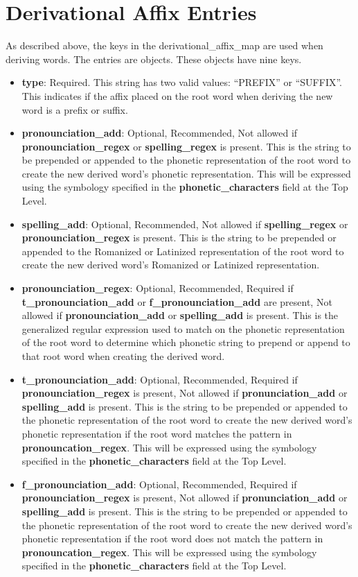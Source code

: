 \chapter{Derivational Affix Entries}
As described above, the keys in the derivational\_affix\_map are used when deriving words.  The entries are objects.  These objects have nine keys.
\begin{itemize}
	\item \textbf{type}: Required.  This string has two valid values: ``PREFIX'' or ``SUFFIX''.  This indicates if the affix placed on the root word when deriving the new word is a prefix or suffix.
	\item \textbf{pronounciation\_add}: Optional, Recommended, Not allowed if \textbf{pronounciation\_regex} or \textbf{spelling\_regex} is present.  This is the string to be prepended or appended to the phonetic representation of the root word to create the new derived word's phonetic representation.   This will be expressed using the symbology specified in the \textbf{phonetic\_characters} field at the Top Level.
	\item \textbf{spelling\_add}: Optional, Recommended, Not allowed if \textbf{spelling\_regex} or \textbf{pronounciation\_regex} is present.  This is the string to be prepended or appended to the Romanized or Latinized representation of the root word to create the new derived word's Romanized or Latinized representation.
	\item \textbf{pronounciation\_regex}: Optional, Recommended, Required if \textbf{t\_pronounciation\_add} or \textbf{f\_pronounciation\_add} are present, Not allowed if \textbf{pronounciation\_add} or \textbf{spelling\_add} is present.  This is the generalized regular expression used to match on the phonetic representation of the root word to determine which phonetic string to prepend or append to that root word when creating the derived word.
	\item \textbf{t\_pronounciation\_add}: Optional, Recommended, Required if \textbf{pronounciation\_regex} is present, Not allowed if \textbf{pronunciation\_add} or \textbf{spelling\_add} is present.  This is the string to be prepended or appended to the phonetic representation of the root word to create the new derived word's phonetic representation if the root word matches the pattern in \textbf{pronouncation\_regex}.  This will be expressed using the symbology specified in the \textbf{phonetic\_characters} field at the Top Level.
	\item \textbf{f\_pronounciation\_add}: Optional, Recommended, Required if \textbf{pronounciation\_regex} is present, Not allowed if \textbf{pronunciation\_add} or \textbf{spelling\_add} is present.  This is the string to be prepended or appended to the phonetic representation of the root word to create the new derived word's phonetic representation if the root word does not match the pattern in \textbf{pronouncation\_regex}.  This will be expressed using the symbology specified in the \textbf{phonetic\_characters} field at the Top Level.

\end{itemize}

